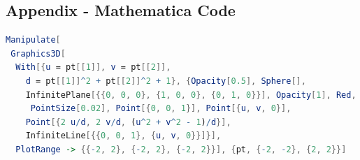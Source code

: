 \documentclass[12pt]{amsart}
\theoremstyle{definition}
\begin{document}
\begin{flushleft}
\section{Appendix - Mathematica Code}
\begin{lstlisting}[language=Mathematica]
Manipulate[
 Graphics3D[
  With[{u = pt[[1]], v = pt[[2]], 
    d = pt[[1]]^2 + pt[[2]]^2 + 1}, {Opacity[0.5], Sphere[], 
    InfinitePlane[{{0, 0, 0}, {1, 0, 0}, {0, 1, 0}}], Opacity[1], Red,
     PointSize[0.02], Point[{0, 0, 1}], Point[{u, v, 0}], 
    Point[{2 u/d, 2 v/d, (u^2 + v^2 - 1)/d}], 
    InfiniteLine[{{0, 0, 1}, {u, v, 0}}]}], 
  PlotRange -> {{-2, 2}, {-2, 2}, {-2, 2}}], {pt, {-2, -2}, {2, 2}}]
\end{lstlisting}
\end{flushleft}
\end{document}
